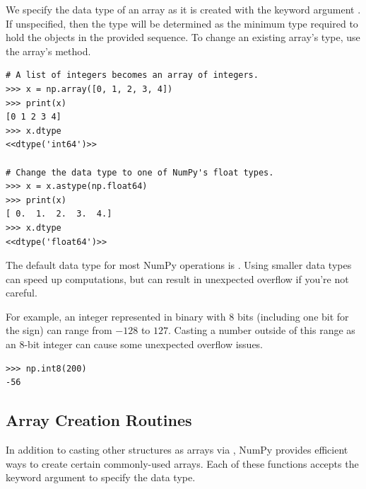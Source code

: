 We specify the data type of an array as it is created with the keyword argument .
If unspecified, then the type will be determined as the minimum type required to hold the objects in the provided sequence.
To change an existing array's type, use the array's  method.

\begin{lstlisting}
# A list of integers becomes an array of integers.
>>> x = np.array([0, 1, 2, 3, 4])
>>> print(x)
[0 1 2 3 4]
>>> x.dtype
<<dtype('int64')>>

# Change the data type to one of NumPy's float types.
>>> x = x.astype(np.float64)
>>> print(x)
[ 0.  1.  2.  3.  4.]
>>> x.dtype
<<dtype('float64')>>
\end{lstlisting}

\begin{warn}
The default data type for most NumPy operations is .
Using smaller data types can speed up computations, but can result in unexpected overflow if you're not careful.

For example, an integer represented in binary with 8 bits (including one bit for the sign) can range from $-128$ to $127$.
Casting a number outside of this range as an 8-bit integer can cause some unexpected overflow issues.

\begin{lstlisting}
>>> np.int8(200)
-56
\end{lstlisting}
\end{warn}

\subsection*{Array Creation Routines} %

In addition to casting other structures as arrays via , NumPy provides efficient ways to create certain commonly-used arrays.
Each of these functions accepts the keyword argument  to specify the data type.

